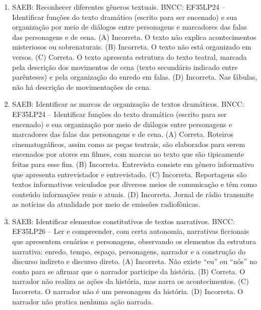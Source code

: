 \begin{enumerate}
\item
SAEB: Reconhecer diferentes gêneros textuais.
BNCC: EF35LP24 -- Identificar funções do texto dramático (escrito para ser
encenado) e sua organização por meio de diálogos entre personagens e
marcadores das falas das personagens e de cena.
(A) Incorreta. O texto não explica acontecimentos misteriosos ou
sobrenaturais.
(B) Incorreta. O texto não está organizado em versos.
(C) Correta. O texto apresenta estrutura do texto teatral, marcada pela
descrição dos movimentos de cena (texto secundário indicado entre
parênteses) e pela organização do enredo em falas.
(D) Incorreta. Nas fábulas, não há descrição de movimentações de cena.

\item
SAEB: Identificar as marcas de organização de textos dramáticos.
BNCC: EF35LP24 -- Identificar funções do texto dramático (escrito para
ser encenado) e sua organização por meio de diálogos entre personagens e
marcadores das falas das personagens e de cena.
(A) Correta. Roteiros cinematográficos, assim como as peças teatrais,
são elaborados para serem encenados por atores em filmes, com marcas
no texto que são tipicamente feitas para esse fim.
(B) Incorreta. Entrevista consiste em gênero informativo que apresenta
entrevistador e entrevistado.
(C) Incorreta. Reportagens são textos informativos veiculados por
diversos meios de comunicação e têm como conteúdo informações reais e
atuais.
(D) Incorreta. Jornal de rádio transmite as notícias da atualidade por
meio de emissões radiofônicas.

\item
SAEB: Identificar elementos constitutivos de textos narrativos.
BNCC: EF35LP26 -- Ler e compreender, com certa autonomia, narrativas
ficcionais que apresentem cenários e personagens, observando os
elementos da estrutura narrativa: enredo, tempo, espaço, personagens,
narrador e a construção do discurso indireto e discurso direto.
(A) Incorreta. Não existe ``eu'' ou ``nós'' no conto para se afirmar
que o narrador participe da história.
(B) Correta. O narrador não realiza as ações da história, mas narra os
acontecimentos.
(C) Incorreta. O narrador não é um personagem da história.
(D) Incorreta. O narrador não pratica nenhuma ação narrada.
\end{enumerate}


